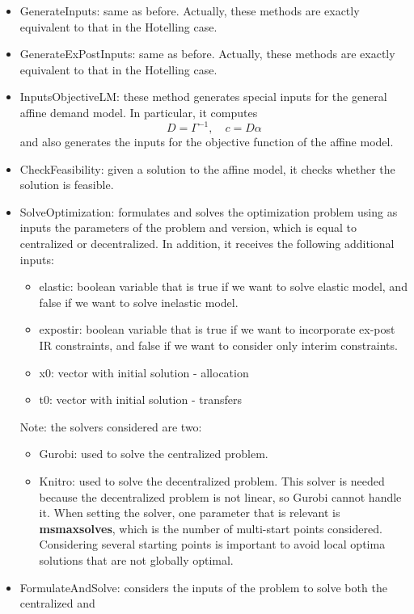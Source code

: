 \documentclass[11pt, oneside]{article}
\begin{document}
\begin{itemize}
  \item GenerateInputs: same as before. Actually, these methods are exactly equivalent to that in the Hotelling case.
  \item GenerateExPostInputs: same as before. Actually, these methods are exactly equivalent to that in the Hotelling case.
  \item InputsObjectiveLM: these method generates special inputs for the general affine demand model. In particular, it computes
  \[
  D = \Gamma^{-1}, \quad c = D \alpha
  \]
  and also generates the inputs for the objective function of the affine model.
  \item CheckFeasibility: given a solution to the affine model, it checks whether the solution is feasible.
  \item SolveOptimization: formulates and solves the optimization problem using as inputs the parameters of the problem and version, which is equal to centralized or decentralized.
  In addition, it receives the following additional inputs:
  \begin{itemize}
    \item elastic: boolean variable that is true if we want to solve elastic model, and false if we want to solve inelastic model.
    \item expostir: boolean variable that is true if we want to incorporate ex-post IR constraints, and false if we want to consider only interim constraints.
    \item x0: vector with initial solution - allocation
    \item t0: vector with initial solution - transfers
  \end{itemize}
  Note: the solvers considered are two:
  \begin{itemize}
    \item Gurobi: used to solve the centralized problem.
    \item Knitro: used to solve the decentralized problem. This solver is needed because the decentralized problem
    is not linear, so Gurobi cannot handle it. When setting the solver, one parameter that is relevant is
    \textbf{msmaxsolves}, which is the number of multi-start points considered.
    Considering several starting points is important to avoid local optima solutions
    that are not globally optimal.
  \end{itemize}
  \item FormulateAndSolve: considers the inputs of the problem to solve both the centralized and

\end{itemize}
\end{document}
